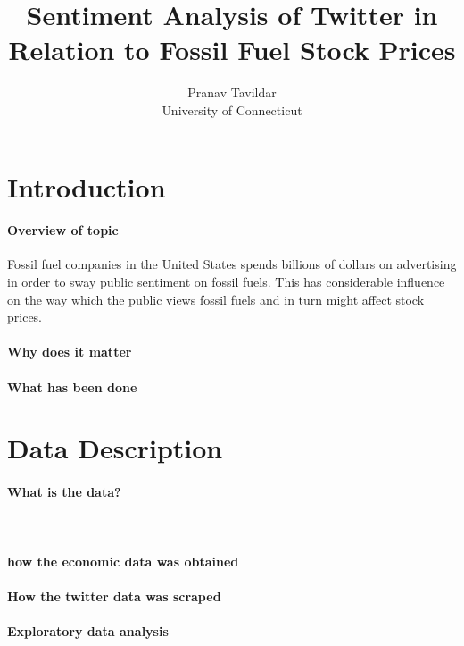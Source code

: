 \documentclass[12pt]{article}
\title{Sentiment Analysis of Twitter in Relation to Fossil Fuel Stock Prices}
\author{Pranav Tavildar\\
  University of Connecticut
}
\begin{document}
\maketitle

\section{Introduction}

\paragraph{Overview of topic}
Fossil fuel companies in the United States spends billions of dollars on advertising in order to sway public sentiment on fossil fuels. This has considerable influence on the way which the public views fossil fuels and in turn might affect stock prices.

\paragraph{Why does it matter}

\paragraph{What has been done}


\section{Data Description}

\paragraph{What is the data?}\

\paragraph{how the economic data was obtained}

\paragraph{How the twitter data was scraped}

\paragraph{Exploratory data analysis}
\end{document}
